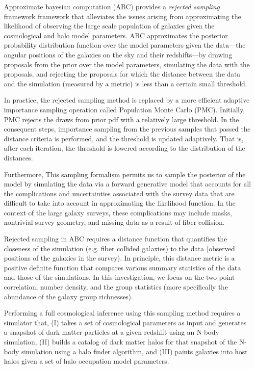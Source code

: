 \documentclass[12pt, preprint]{aastex}
\begin{document}
Approximate bayesian computation (ABC) provides a \emph{rejected sampling} framework framework that alleviates the issues arising from approximating the likelihood of observing the large scale population of galaxies given the cosmological and halo model parameters. ABC approximates the posterior probability distribution function over the model parameters given the data---the angular positions of the galaxies on the sky and their redshifts---by drawing proposals from the prior over the model parameters, simulating the data with the proposals, and rejecting the proposals for which the distance between the data and the simulation (measured by a metric) is less than a certain small threshold.

In practice, the rejected sampling method is replaced by a more efficient adaptive importance sampling operation called Population Monte Carlo (PMC). Initially, PMC rejects the draws from prior pdf with a relatively large threshold. In the consequent steps, importance sampling from the previous samples that passed the distance criteria is performed, and the threshold is updated adaptively. That is, after each iteration, the threshold is lowered according to the distribution of the distances.  
 
Furthermore, This sampling formalism permits us to sample the posterior of the model by simulating the data via a forward generative model that accounts for all the complications and uncertainties associated with the survey data that are difficult to take into account in approximating the likelihood function. In the context of the large galaxy surveys, these complications may include masks, nontrivial survey geometry, and missing data as a result of fiber collision.

Rejected sampling in ABC requires a distance function that quantifies the closeness of the simulation (e.g. fiber collided galaxies) to the data (observed positions of the galaxies in the survey). In principle, this distance metric is a positive definite function  that compares various summary statistics of the data and those of the simulations. In this investigation, we focus on the two-point correlation, number density, and the group statistics (more specifically the abundance of the galaxy group richnesses). 

Performing a full cosmological inference using this sampling method requires a simulator that, (I) takes a set of cosmological parameters as input and generates a snapshot of dark matter particles at a given redshift using an N-body simulation, (II) builds a catalog of dark matter halos for that snapshot of the N-body simulation using a halo finder algorithm, and (III) paints galaxies into host halos given a set of halo occupation model parameters. 
\end{document}
